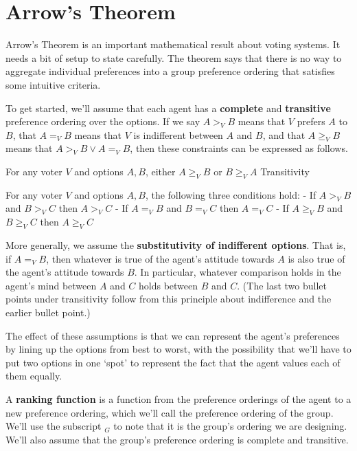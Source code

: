 \documentclass[11pt,]{article}
\providecommand{\tightlist}{%
  \setlength{\itemsep}{0pt}\setlength{\parskip}{0pt}}
\begin{document}
\hypertarget{arrows-theorem}{%
\section{Arrow's Theorem}\label{arrows-theorem}}

Arrow's Theorem is an important mathematical result about voting
systems. It needs a bit of setup to state carefully. The theorem says
that there is no way to aggregate individual preferences into a group
preference ordering that satisfies some intuitive criteria.

To get started, we'll assume that each agent has a \textbf{complete} and
\textbf{transitive} preference ordering over the options. If we say
\(A >_V B\) means that \(V\) prefers \(A\) to \(B\), that \(A =_V B\)
means that \(V\) is indifferent between \(A\) and \(B\), and that
\(A \geq_V B\) means that \(A >_V B \vee A =_V B\), then these
constraints can be expressed as follows.

\begin{description}
\tightlist
\item[Completeness]
For any voter \(V\) and options \(A, B\), either \(A \geq_V B\) or
\(B \geq_V A\) Transitivity

For any voter \(V\) and options \(A, B\), the following three conditions
hold: - If \(A >_V B\) and \(B >_V C\) then \(A >_V C\) - If \(A =_V B\)
and \(B =_V C\) then \(A =_V C\) - If \(A \geq_V B\) and \(B \geq_V C\)
then \(A \geq_V C\)
\end{description}

More generally, we assume the \textbf{substitutivity of indifferent
options}. That is, if \(A =_V B\), then whatever is true of the agent's
attitude towards \(A\) is also true of the agent's attitude towards
\(B\). In particular, whatever comparison holds in the agent's mind
between \(A\) and \(C\) holds between \(B\) and \(C\). (The last two
bullet points under transitivity follow from this principle about
indifference and the earlier bullet point.)

The effect of these assumptions is that we can represent the agent's
preferences by lining up the options from best to worst, with the
possibility that we'll have to put two options in one `spot' to
represent the fact that the agent values each of them equally.

A \textbf{ranking function} is a function from the preference orderings
of the agent to a new preference ordering, which we'll call the
preference ordering of the group. We'll use the subscript \(_G\) to note
that it is the group's ordering we are designing. We'll also assume that
the group's preference ordering is complete and transitive.
\end{document}
